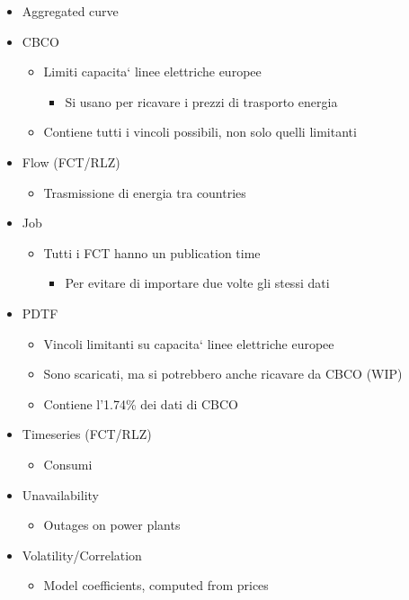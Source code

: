 \begin{itemize}
    \item Aggregated curve
    
    \item CBCO
    \begin{itemize}
        \item Limiti capacita` linee elettriche europee
        \begin{itemize}
            \item Si usano per ricavare i prezzi di trasporto energia
        \end{itemize}
        
        \item Contiene tutti i vincoli possibili, non solo quelli limitanti
    \end{itemize}
    
    \item Flow (FCT/RLZ)
    \begin{itemize}
        \item Trasmissione di energia tra countries
    \end{itemize}
    
    \item Job
    \begin{itemize}
        \item Tutti i FCT hanno un publication time
        \begin{itemize}
            \item Per evitare di importare due volte gli stessi dati
        \end{itemize}
    \end{itemize}
    
    \item PDTF
    \begin{itemize}
        \item Vincoli limitanti su capacita` linee elettriche europee
        \item Sono scaricati, ma si potrebbero anche ricavare da CBCO (WIP)
        \item Contiene l'1.74\% dei dati di CBCO
    \end{itemize}
    
    \item Timeseries (FCT/RLZ)
    \begin{itemize}
        \item Consumi
    \end{itemize}
    
    \item Unavailability
    \begin{itemize}
        \item Outages on power plants
    \end{itemize}
    
    \item Volatility/Correlation
    \begin{itemize}
        \item Model coefficients, computed from prices
    \end{itemize}
    
\end{itemize}
